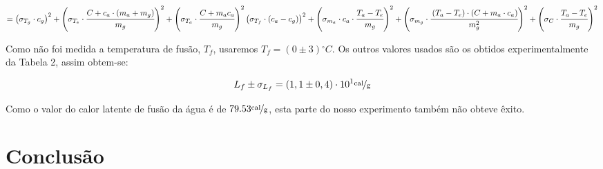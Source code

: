 \documentclass[a4paper]{article}
\begin{document}
			$=
				\left(\sigma_{T_{g}}\cdot c_{g}\right)^{2}+
				\left(\sigma_{T_{e}}\cdot\cfrac{C+c_{a}\cdot\left(m_{a}+m_{g}\right)}{m_{g}}\right)^{2}+
				\left(\sigma_{T_{a}}\cdot\cfrac{C+m_{a}c_{a}}{m_{g}}\right)^{2}
				\left(\sigma_{T_{f}}\cdot
				\left(c_{a}-c_{g}\right)\right)^{2}+
				\left(\sigma_{m_{a}}\cdot c_{a}\cdot\cfrac{T_{a}-T_{e}}{m_{g}}\right)^{2}+
				\left(\sigma_{m_{g}}\cdot\cfrac{\left(T_{a}-T_{e}\right)\cdot\left(C+m_{a}\cdot c_{a}\right)}{m_{g}^{2}}\right)^{2}+
				\left(\sigma_{C}\cdot\cfrac{T_{a}-T_{e}}{m_{g}}\right)^{2}
			$

			Como não foi medida a temperatura de fusão, $T_{f}$, usaremos $T_{f}=\left(0\pm3\right)\unit{^{\circ}C}$.
			Os outros valores usados são os obtidos experimentalmente da Tabela
			2, assim obtem-se:

			\[
				L_{f}\pm\sigma_{L_{f}}=\left(1,1\pm0,4\right)\cdot10^{1}\unitfrac{cal}{g}
			\]


			Como o valor do calor latente de fusão da água é de $79.53\unitfrac{cal}{g}$,
			esta parte do nosso experimento também não obteve êxito.


	\section{Conclusão}
\end{document}
